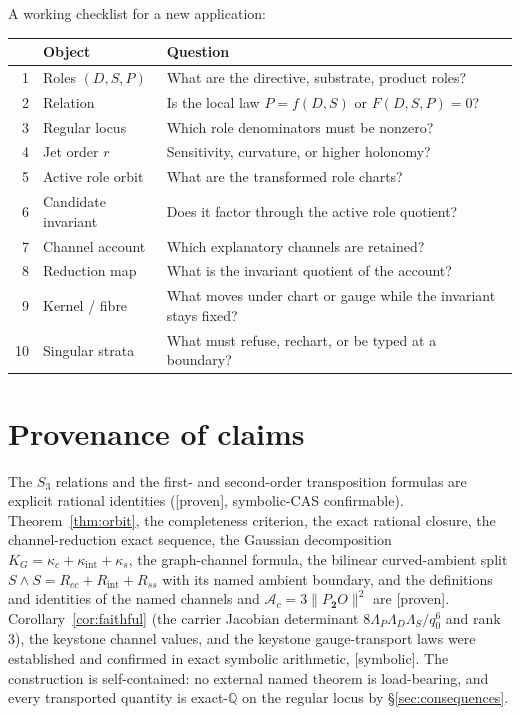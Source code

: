 \documentclass[11pt]{article}
\newcommand{\Proven}{\textsf{[proven]}}
\newcommand{\Symbolic}{\textsf{[symbolic]}}
\theoremstyle{plain}
\theoremstyle{definition}
\newcommand{\KG}{K_{G}}
\newcommand{\Ac}{\mathcal{A}_c}
\newcommand{\kc}{\kappa_{c}}
\newcommand{\kint}{\kappa_{\mathrm{int}}}
\newcommand{\ks}{\kappa_{s}}
\begin{document}
\noindent A working checklist for a new application:
\begin{center}
\small
\begin{tabular}{r l l}
\hline
& Object & Question\\
\hline
1 & Roles $(D,S,P)$ & What are the directive, substrate, product roles?\\
2 & Relation & Is the local law $P=f(D,S)$ or $F(D,S,P)=0$?\\
3 & Regular locus & Which role denominators must be nonzero?\\
4 & Jet order $r$ & Sensitivity, curvature, or higher holonomy?\\
5 & Active role orbit & What are the transformed role charts?\\
6 & Candidate invariant & Does it factor through the active role quotient?\\
7 & Channel account & Which explanatory channels are retained?\\
8 & Reduction map & What is the invariant quotient of the account?\\
9 & Kernel / fibre & What moves under chart or gauge while the invariant stays fixed?\\
10 & Singular strata & What must refuse, rechart, or be typed at a boundary?\\
\hline
\end{tabular}
\end{center}

\section*{Provenance of claims}

The $S_3$ relations and the first- and second-order transposition formulas are explicit rational
identities (\Proven, symbolic-CAS confirmable). Theorem~\ref{thm:orbit}, the completeness criterion,
the exact rational closure, the channel-reduction exact sequence, the Gaussian decomposition
$\KG=\kc+\kint+\ks$, the graph-channel formula, the bilinear curved-ambient split
$S\wedge S=R_{cc}+R_{\mathrm{int}}+R_{ss}$ with its named ambient boundary, and the definitions and
identities of the named channels and $\Ac=3\lVert P_{\mathbf 2}O\rVert^2$ are \Proven.
Corollary~\ref{cor:faithful} (the carrier Jacobian determinant $8\Lambda_P\Lambda_D\Lambda_S/q_0^6$
and rank $3$), the keystone channel values, and the keystone gauge-transport laws were established and
confirmed in exact symbolic arithmetic, \Symbolic. The construction is self-contained: no external
named theorem is load-bearing, and every transported quantity is exact-$\mathbb Q$ on the regular
locus by \S\ref{sec:consequences}.
\end{document}
